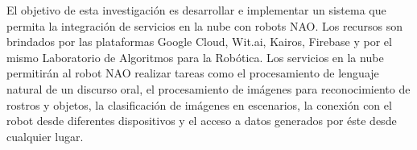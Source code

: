 
El objetivo de esta investigación es desarrollar e implementar un sistema
que permita la integración de servicios en la nube
con robots NAO.
Los recursos son brindados por las plataformas
Google Cloud, Wit.ai, Kairos, Firebase y por
el mismo Laboratorio de Algoritmos para la
Robótica.
Los servicios en la nube permitirán al robot NAO
realizar tareas como el procesamiento de lenguaje
natural de un discurso oral, el procesamiento 
de imágenes para reconocimiento de rostros
y objetos, la clasificación de
imágenes en escenarios, la conexión con el robot desde diferentes dispositivos y el acceso a datos generados por
éste desde cualquier lugar.

